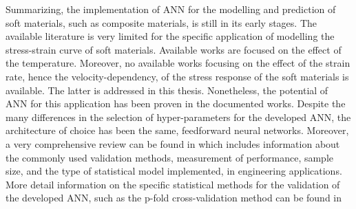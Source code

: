Summarizing, the implementation of ANN for the modelling and prediction of soft materials, such as composite materials, is still in its early stages. The available literature is very limited for the specific application of modelling the stress-strain curve of soft materials. Available works are focused on the effect of the temperature. Moreover, no available works focusing on the effect of the strain rate, hence the velocity-dependency, of the stress response of the soft materials is available. The latter is addressed in this thesis. Nonetheless, the potential of ANN for this application has been proven in the documented works. Despite the many differences in the selection of hyper-parameters for the developed ANN, the architecture of choice has been the same, feedforward neural networks. Moreover, a very comprehensive review can be found in \cite{paliwal2009neural} which includes information about the commonly used validation methods, measurement of performance, sample size, and the type of statistical model implemented, in engineering applications. More detail information on the specific statistical methods for the validation of the developed ANN, such as the p-fold cross-validation method can be found in \cite{wang2007review,koskela2003neural}





